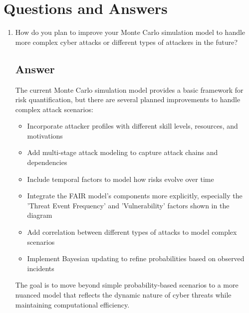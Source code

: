 \section{Questions and Answers}
\begin{enumerate}
    \item How do you plan to improve your Monte Carlo simulation model to handle more complex cyber attacks or different types of attackers in the future?
    
    \subsection*{Answer}
The current Monte Carlo simulation model provides a basic framework for risk quantification, 
    but there are several planned improvements to handle complex attack scenarios:
    
    \begin{itemize}
        \item Incorporate attacker profiles with different skill levels, resources, and motivations
        \item Add multi-stage attack modeling to capture attack chains and dependencies
        \item Include temporal factors to model how risks evolve over time
        \item Integrate the FAIR model's components more explicitly, especially the 'Threat Event Frequency' 
              and 'Vulnerability' factors shown in the diagram
        \item Add correlation between different types of attacks to model complex scenarios
        \item Implement Bayesian updating to refine probabilities based on observed incidents
    \end{itemize}
    
    The goal is to move beyond simple probability-based scenarios to a more nuanced model that 
    reflects the dynamic nature of cyber threats while maintaining computational efficiency.
\end{enumerate}


% 